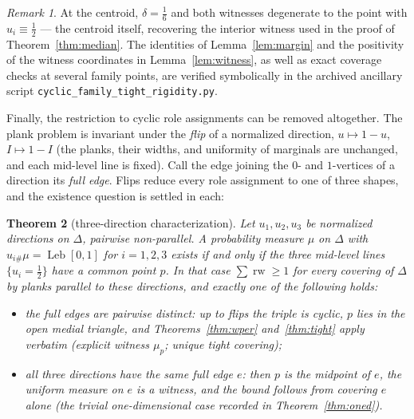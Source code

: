 \documentclass[11pt,reqno]{amsart}
\theoremstyle{plain}
\newtheorem{theorem}{Theorem}[section]
\theoremstyle{definition}
\theoremstyle{remark}
\newtheorem{remark}[theorem]{Remark}
\newcommand{\rw}{\operatorname{rw}}
\newcommand{\Leb}{\operatorname{Leb}}
\begin{document}
\begin{remark}
At the centroid, $\delta=\tfrac16$ and both witnesses degenerate to the point
with $u_i\equiv\tfrac12$ --- the centroid itself, recovering the interior
witness used in the proof of Theorem~\ref{thm:median}. The identities of
Lemma~\ref{lem:margin} and the positivity of the witness coordinates in
Lemma~\ref{lem:witness}, as well as exact coverage checks
at several family points, are verified symbolically in the archived ancillary
script \texttt{cyclic\_family\_tight\_rigidity.py}.
\end{remark}

Finally, the restriction to cyclic role assignments can be removed altogether.
The plank problem is invariant under the \emph{flip} of a normalized direction,
$u\mapsto1-u$, $I\mapsto1-I$ (the planks, their widths, and uniformity of
marginals are unchanged, and each mid-level line is fixed). Call the edge
joining the $0$- and $1$-vertices of a direction its \emph{full edge}. Flips
reduce every role assignment to one of three shapes, and the existence question
is settled in each:

\begin{theorem}[three-direction characterization]\label{thm:char}
Let $u_1,u_2,u_3$ be normalized directions on $\Delta$, pairwise non-parallel.
A probability measure $\mu$ on $\Delta$ with $u_{i\#}\mu=\Leb[0,1]$ for
$i=1,2,3$ exists if and only if the three mid-level lines $\{u_i=\tfrac12\}$
have a common point $p$. In that case $\sum\rw\ge1$ for every covering of
$\Delta$ by planks parallel to these directions, and exactly one of the
following holds:
\begin{itemize}
\item[(a)] the full edges are pairwise distinct: up to flips the triple is
cyclic, $p$ lies in the open medial triangle, and Theorems~\ref{thm:wper}
and~\ref{thm:tight} apply verbatim (explicit witness $\mu_p$; unique tight
covering);
\item[(b)] all three directions have the same full edge $e$: then $p$ is the
midpoint of $e$, the uniform measure on $e$ is a witness, and the bound follows
from covering $e$ alone (the trivial one-dimensional case recorded in
Theorem~\ref{thm:oned}).
\end{itemize}
\end{theorem}
\end{document}
